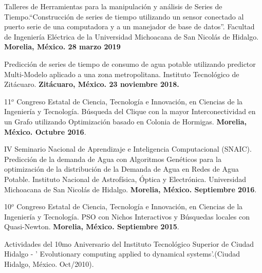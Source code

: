 \documentclass[10pt]{article}
\newenvironment{innerlist}[1][\enskip\textbullet]%
        {\begin{compactitem}[#1]}{\end{compactitem}}
\begin{document}
\begin{innerlist}
\item Talleres de Herramientas para la manipulación y análisis de Series de Tiempo.``Construcción de series de tiempo utilizando un sensor conectado al puerto serie de una computadora y a un manejador de base de datos''. Facultad de Ingeniería Eléctrica de la Universidad Michoacana de San Nicolás de Hidalgo. \textbf{Morelia, México. 28 marzo 2019}

\item Predicción de series de tiempo de consumo de agua potable utilizando predictor Multi-Modelo aplicado a una zona metropolitana. Instituto Tecnológico de Zitácuaro. \textbf{Zitácuaro, México. 23 noviembre 2018.}

\item 11$^o$ Congreso Estatal de Ciencia, Tecnología e Innovación, en  Ciencias de la Ingeniería y Tecnología. Búsqueda del Clique con la mayor Interconectividad en un Grafo utilizando Optimización basado en Colonia de Hormigas. \textbf{Morelia, México. Octubre 2016}.

\item IV Seminario Nacional de Aprendizaje e Inteligencia Computacional (SNAIC). Predicción de la demanda de Agua con Algoritmos Genéticos para la optimización de la distribución de la Demanda de Agua en Redes de Agua Potable. Instituto Nacional de Astrofísica, Óptica y Electrónica. Universidad Michoacana de San Nicolás de Hidalgo. \textbf{Morelia, México. Septiembre 2016}.

 \item 10$^o$ Congreso Estatal de Ciencia, Tecnología e Innovación, en  Ciencias de la Ingeniería y Tecnología. PSO con Nichos Interactivos y B\'{u}squedas locales con Quasi-Newton. \textbf{Morelia, México. Septiembre 2015}.
 
 \item Actividades del 10mo Aniversario del  Instituto Tecnológico Superior de Ciudad Hidalgo - ' Evolutionary computing applied to dynamical systems'.(Ciudad Hidalgo, México. Oct/2010).
\end{innerlist} 
\end{document}
